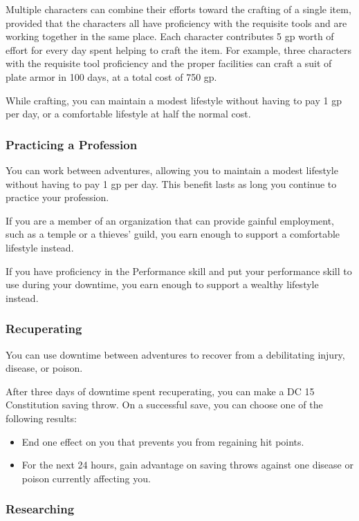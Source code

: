 Multiple characters can combine their efforts toward the crafting of a single item, provided that the characters all have proficiency with the requisite tools and are working together in the same place. Each character contributes 5 gp worth of effort for every day spent helping to craft the item. For example, three characters with the requisite tool proficiency and the proper facilities can craft a suit of plate armor in 100 days, at a total cost of 750 gp.

While crafting, you can maintain a modest lifestyle without having to pay 1 gp per day, or a comfortable lifestyle at half the normal cost.

\subsubsection{Practicing a Profession}

You can work between adventures, allowing you to maintain a modest lifestyle without having to pay 1 gp per day. This benefit lasts as long you continue to practice your profession.

If you are a member of an organization that can provide gainful employment, such as a temple or a thieves' guild, you earn enough to support a comfortable lifestyle instead.

If you have proficiency in the Performance skill and put your performance skill to use during your downtime, you earn enough to support a wealthy lifestyle instead.

\subsubsection{Recuperating}

You can use downtime between adventures to recover from a debilitating injury, disease, or poison.

After three days of downtime spent recuperating, you can make a DC 15 Constitution saving throw. On a successful save, you can choose one of the following results:
\begin{itemize}
    \item End one effect on you that prevents you from regaining hit points.
    \item For the next 24 hours, gain advantage on saving throws against one disease or poison currently affecting you.
\end{itemize}
\subsubsection{Researching}

